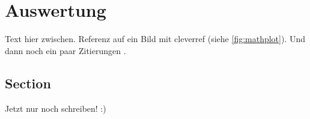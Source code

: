 \chapter{Auswertung} \label{cha:Auswertung}

Text hier zwischen. Referenz auf ein Bild mit cleverref (siehe \cref{fig:mathplot}). Und dann noch ein paar Zitierungen \cite{Reinhold:2013fk,Moon,IEEE2011}.

\section{Section}

Jetzt nur noch schreiben! :)


